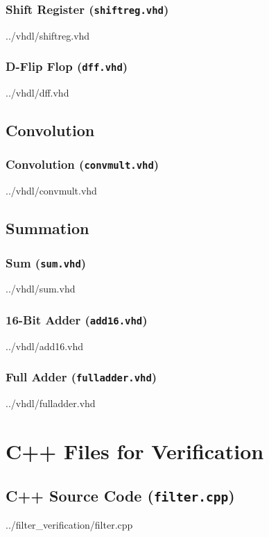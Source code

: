\documentclass[12pt]{article}
\newcommand{\VhdlListing}{}
\newcommand{\CppListing}{}
\begin{document}
\subsubsection{Shift Register (\texttt{shiftreg.vhd})}
\label{lst:shiftreg.vhd}
\VhdlListing{../vhdl/shiftreg.vhd}

\subsubsection{D-Flip Flop (\texttt{dff.vhd})}
\label{lst:dff.vhd}
\VhdlListing{../vhdl/dff.vhd}

\subsection{Convolution}

\subsubsection{Convolution (\texttt{convmult.vhd})}
\label{lst:convmult.vhd}
\VhdlListing{../vhdl/convmult.vhd}

\subsection{Summation}

\subsubsection{Sum (\texttt{sum.vhd})}
\label{lst:sum.vhd}
\VhdlListing{../vhdl/sum.vhd}

\subsubsection{16-Bit Adder (\texttt{add16.vhd})}
\label{lst:add16.vhd}
\VhdlListing{../vhdl/add16.vhd}

\subsubsection{Full Adder (\texttt{fulladder.vhd})}
\label{lst:fulladder.vhd}
\VhdlListing{../vhdl/fulladder.vhd}

\section{C++ Files for Verification}

\subsection{C++ Source Code (\texttt{filter.cpp})}
\label{lst:filter.cpp}
\CppListing{../filter_verification/filter.cpp}
\end{document}
